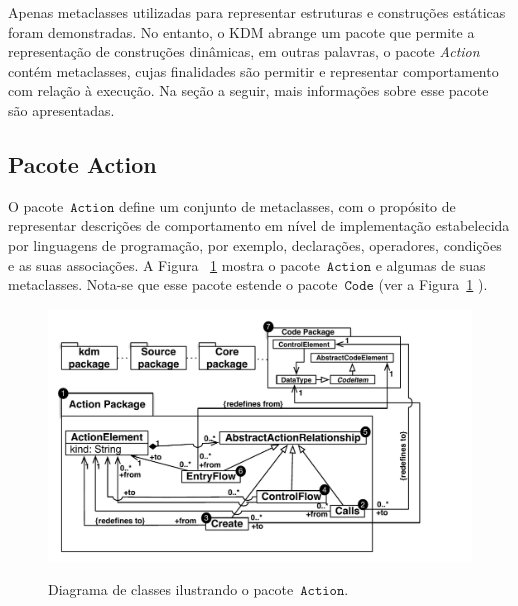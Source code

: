 %
%
%
Apenas metaclasses utilizadas para representar estruturas e construções estáticas foram demonstradas. No entanto, o KDM  abrange um pacote que permite a representação de construções dinâmicas, em outras palavras, o pacote \textit{Action} contém metaclasses, cujas finalidades são  permitir e representar comportamento  com relação à execução. Na seção a seguir, mais informações sobre esse pacote são apresentadas.

\subsection{Pacote Action}\label{sec:actionPackage}

O pacote~$\mathtt{Action}$ define um conjunto de metaclasses, com o propósito de representar descrições de comportamento em nível de implementação estabelecida por linguagens de programação, por exemplo, declarações, operadores, condições e as suas associações. A Figura ~\ref{fig:actionModel}  mostra o pacote~$\mathtt{Action}$ e algumas de suas metaclasses. Nota-se que esse pacote estende o pacote~$\mathtt{Code}$ (ver a Figura~\ref {fig:actionModel} ).


\begin{figure}[!ht]
	\centering
	\caption{Diagrama de classes ilustrando o pacote~$\mathtt{Action}$.}
	\includegraphics[scale=0.67]{images/ActionModel_Class_Diagram}
	\label{fig:actionModel}
\end{figure}

